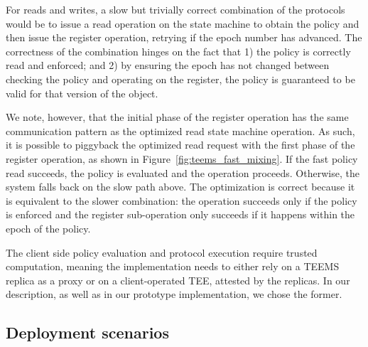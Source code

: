%


For reads and writes, a slow but trivially correct combination of
the protocols would be to issue a read operation on the state
machine to obtain the policy and then issue the register
operation, retrying if the epoch number has advanced.
The correctness of the combination hinges on the fact that 1) the
policy is correctly read and enforced; and 2) by ensuring the epoch
has not changed between checking the policy and operating on the
register, the policy is guaranteed to be valid for that version of the
object.


We note, however, that the initial phase of the register operation has
the same communication pattern as the optimized read state machine
operation. As such, it is possible to piggyback the optimized read
request with the first phase of the register operation, as shown in
Figure~\ref{fig:teems_fast_mixing}. If the fast policy read succeeds,
the policy is evaluated and the operation proceeds.  Otherwise, the
system falls back on the slow path above. The optimization is correct
because it is equivalent to the slower combination: the operation
succeeds only if the policy is enforced and the register sub-operation
only succeeds if it happens within the epoch of the policy.

The client side policy evaluation and protocol execution require
trusted computation, meaning the implementation needs to either
rely on a \ac{TEEMS} replica as a proxy or on a client-operated \ac{TEE},
attested by the replicas. In our description, as well as in our
prototype implementation, we chose the former.

\subsection{Deployment scenarios}

